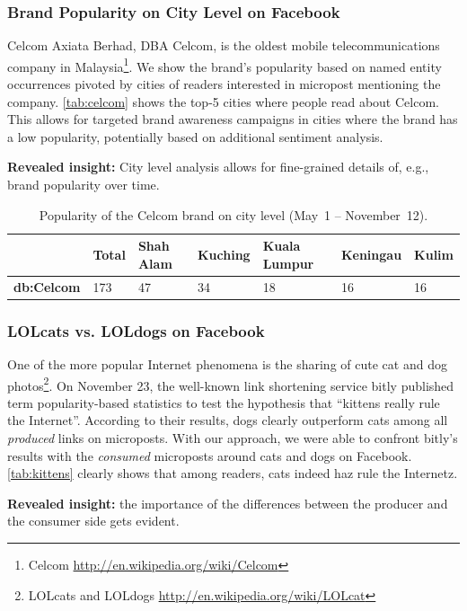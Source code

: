 \documentclass{iosart2c}
\begin{document}
\subsubsection{Brand Popularity on City Level on Facebook}
Celcom Axiata Berhad, DBA Celcom, is the oldest mobile telecommunications company in Malaysia\footnote{Celcom \url{http://en.wikipedia.org/wiki/Celcom}}.
We show the brand's popularity based on named entity occurrences pivoted by cities of readers interested in micropost mentioning the company.
\autoref{tab:celcom} shows the top-5 cities where people read about Celcom.
This allows for targeted brand awareness campaigns in cities where the brand has a low popularity, potentially based on additional sentiment analysis.

\textbf{Revealed insight:}
City level analysis allows for fine-grained details of, e.g., brand popularity over time.

\begin{table}
    \begin{tabular}{ | l | l | l | l | l | l | l |}
    \hline
	& \textbf{Total} & \textbf{Shah Alam} & \textbf{Kuching} & \textbf{Kuala Lumpur} & \textbf{Keningau} & \textbf{Kulim}\\ \hline
\textbf{db:Celcom} & 173 & 47 & 34 & 18 & 16 & 16\\
    \hline
  \end{tabular}
  \caption{Popularity of the Celcom brand on city level (May~1 -- November~12).}
  \label{tab:celcom}  
\end{table}

\subsubsection{LOLcats vs. LOLdogs on Facebook}
One of the more popular Internet phenomena is the sharing of cute cat and dog photos\footnote{LOLcats and LOLdogs \url{http://en.wikipedia.org/wiki/LOLcat}}.
On November 23, the well-known link shortening service bitly published term popularity-based statistics to test the hypothesis that ``kittens really rule the Internet''.
According to their results, dogs clearly outperform cats among all \emph{produced} links on microposts.
With our approach, we were able to confront bitly's results with the \emph{consumed} microposts around cats and dogs on Facebook.
\autoref{tab:kittens} clearly shows that among readers, cats indeed haz rule the Internetz.

\textbf{Revealed insight:}
the importance of the differences between the producer and the consumer side gets evident.
\end{document}
